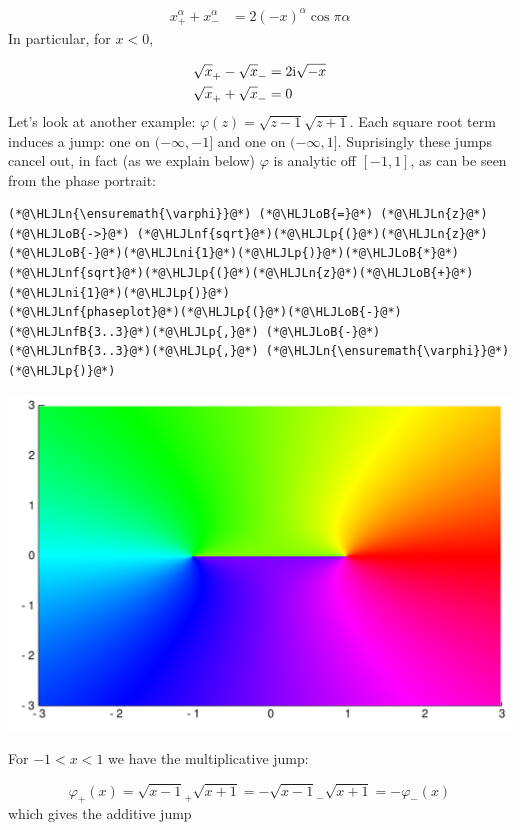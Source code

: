 \documentclass[12pt,a4paper]{article}
\newcommand{\HLJLn}[1]{#1}
\newcommand{\HLJLnf}[1]{\textcolor[RGB]{66,102,213}{#1}}
\newcommand{\HLJLnfB}[1]{\textcolor[RGB]{59,151,46}{#1}}
\newcommand{\HLJLni}[1]{\textcolor[RGB]{59,151,46}{#1}}
\newcommand{\HLJLoB}[1]{\textcolor[RGB]{102,102,102}{\textbf{#1}}}
\newcommand{\HLJLp}[1]{#1}
\def\I{ {\rm i} }
\begin{document}
\begin{align*}
x_+^\alpha + x_-^\alpha & = 2  (-x)^\alpha \cos \pi \alpha
\end{align*}
In particular, for $x < 0$,


\begin{align*}
\sqrt{x}_+ - \sqrt{x}_- &= 2 \I \sqrt{-x} \\
\sqrt{x}_+ + \sqrt{x}_- &= 0
\end{align*}
Let's look at another example: $\varphi(z) = \sqrt{z-1}\sqrt{z+1}$. Each square root term induces a jump: one on $(-\infty,-1]$ and one on $(-\infty,1]$. Suprisingly these jumps cancel out, in fact (as we explain below) $\varphi$ is analytic off $[-1,1]$, as can be seen from the phase portrait:


\begin{lstlisting}
(*@\HLJLn{\ensuremath{\varphi}}@*) (*@\HLJLoB{=}@*) (*@\HLJLn{z}@*) (*@\HLJLoB{->}@*) (*@\HLJLnf{sqrt}@*)(*@\HLJLp{(}@*)(*@\HLJLn{z}@*)(*@\HLJLoB{-}@*)(*@\HLJLni{1}@*)(*@\HLJLp{)}@*)(*@\HLJLoB{*}@*)(*@\HLJLnf{sqrt}@*)(*@\HLJLp{(}@*)(*@\HLJLn{z}@*)(*@\HLJLoB{+}@*)(*@\HLJLni{1}@*)(*@\HLJLp{)}@*)
(*@\HLJLnf{phaseplot}@*)(*@\HLJLp{(}@*)(*@\HLJLoB{-}@*)(*@\HLJLnfB{3..3}@*)(*@\HLJLp{,}@*) (*@\HLJLoB{-}@*)(*@\HLJLnfB{3..3}@*)(*@\HLJLp{,}@*) (*@\HLJLn{\ensuremath{\varphi}}@*)(*@\HLJLp{)}@*)
\end{lstlisting}

\includegraphics[width=\linewidth]{figures/Lecture10_8_1.pdf}

For $-1 < x < 1$ we have the multiplicative jump:

\[
\varphi_+(x) = \sqrt{x-1}_+ \sqrt{x+1} = - \sqrt{x-1}_- \sqrt{x+1} = -\varphi_-(x)
\]
which gives the additive jump
\end{document}
